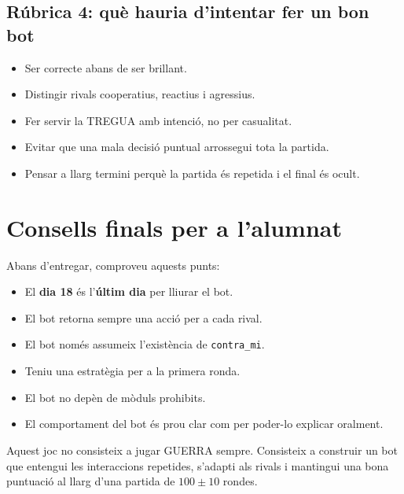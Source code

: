 \documentclass[12pt,a4paper]{report}
\begin{document}
\section{Rúbrica 4: què hauria d'intentar fer un bon bot}

\begin{itemize}
  \item Ser correcte abans de ser brillant.
  \item Distingir rivals cooperatius, reactius i agressius.
  \item Fer servir la TREGUA amb intenció, no per casualitat.
  \item Evitar que una mala decisió puntual arrossegui tota la partida.
  \item Pensar a llarg termini perquè la partida és repetida i el final és ocult.
\end{itemize}

\chapter{Consells finals per a l'alumnat}

Abans d'entregar, comproveu aquests punts:

\begin{itemize}
  \item El \textbf{dia 18} és l'\textbf{últim dia} per lliurar el bot.
  \item El bot retorna sempre una acció per a cada rival.
  \item El bot només assumeix l'existència de \texttt{contra\_mi}.
  \item Teniu una estratègia per a la primera ronda.
  \item El bot no depèn de mòduls prohibits.
  \item El comportament del bot és prou clar com per poder-lo explicar oralment.
\end{itemize}

\begin{tcolorbox}[colback=softblue,colframe=upcblue,title=Idea final]
Aquest joc no consisteix a jugar GUERRA sempre. Consisteix a construir un bot que
entengui les interaccions repetides, s'adapti als rivals i mantingui una bona
puntuació al llarg d'una partida de \(100 \pm 10\) rondes.
\end{tcolorbox}
\end{document}
